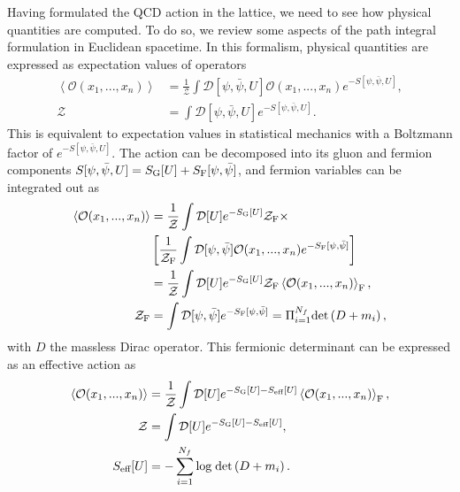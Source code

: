 Having formulated the QCD action in the lattice, we need to see how physical quantities are computed. To do so, we review some aspects of the path integral formulation in Euclidean spacetime. In this formalism, physical quantities are expressed as expectation values of operators
\begin{align}
\left<\mathcal{O}(x_1,...,x_n)\right>&=\frac{1}{\mathcal{Z}}\int\mathcal{D}[\psi,\bar{\psi},U]\mathcal{O}(x_1,...,x_n)e^{-S[\psi,\bar{\psi},U]}, \\
\mathcal{Z}&=\int\mathcal{D}[\psi,\bar{\psi},U]e^{-S[\psi,\bar{\psi},U]}.
\end{align}
This is equivalent to expectation values in statistical mechanics with a Boltzmann factor of $e^{-S[\psi,\bar{\psi},U]}$. The action can be decomposed into its gluon and fermion components $S[\psi,\bar{\psi},U]=S_{\textrm G}[U]+S_{\textrm F}[\psi,\bar{\psi}]$, and fermion variables can be integrated out as
\begin{align}
\left<\mathcal{O}(x_1,...,x_n)\right>&=\frac{1}{\mathcal{Z}}\int\mathcal{D}[U]e^{-S_{\textrm G}[U]}\mathcal{Z}_{\textrm F}\times\\&\left[\frac{1}{\mathcal{Z}_{\textrm F}}\int\mathcal{D}[\psi,\bar{\psi}]\mathcal{O}(x_1,...,x_n)e^{-S_{\textrm F}[\psi,\bar{\psi}]}\right] \\
&=\frac{1}{\mathcal{Z}}\int\mathcal{D}[U]e^{-S_{\textrm G}[U]}\mathcal{Z}_{\textrm F}\left<\mathcal{O}(x_1,...,x_n)\right>_{\textrm F}, \\
\mathcal{Z}_{\textrm F}&=\int\mathcal{D}[\psi,\bar{\psi}]e^{-S_{\textrm F}[\psi,\bar{\psi}]}=\Pi_{i=1}^{N_f}{\textrm{det}}\left(D+m_i\right),
\end{align}
with $D$ the massless Dirac operator. This fermionic determinant can be expressed as an effective action as
\begin{align}
\left<\mathcal{O}(x_1,...,x_n)\right>&=\frac{1}{\mathcal{Z}}\int\mathcal{D}[U]e^{-S_{\textrm G}[U]-S_{\textrm{eff}}[U]}\left<\mathcal{O}(x_1,...,x_n)\right>_{\textrm F}, \\
\mathcal{Z}&=\int\mathcal{D}[U]e^{-S_{\textrm G}[U]-S_{\textrm{eff}}[U]}, \\
S_{\textrm{eff}}[U]&=-\sum_{i=1}^{N_f}{\textrm{log}}\;{\textrm{det}}\left(D+m_i\right).
\end{align}

